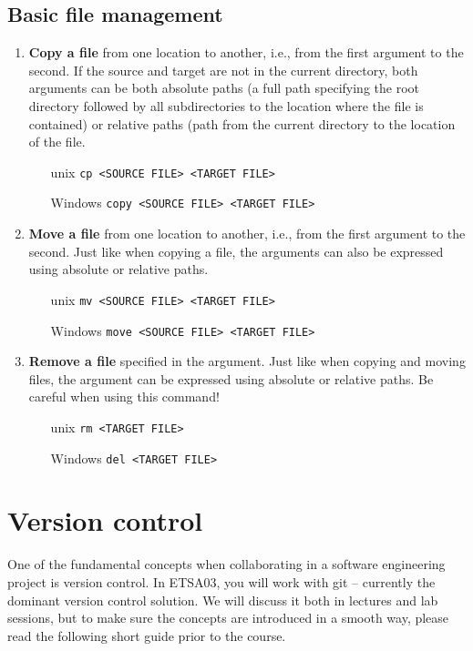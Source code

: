 \documentclass{scrreprt}
\begin{document}
\section{Basic file management}
\begin{enumerate}
\item \textbf{Copy a file} from one location to another, i.e., from the first argument to the second. If the source and target are not in the current directory, both arguments can be both absolute paths (a full path specifying  the root directory followed by all subdirectories to the location where the file is contained) or relative paths (path from the current directory to the location of the file.
\begin{itemize}
\item[unix] \texttt{cp <SOURCE FILE> <TARGET FILE>}
\item[Windows] \texttt{copy <SOURCE FILE> <TARGET FILE>}
\end{itemize}
\item \textbf{Move a file} from one location to another, i.e., from the first argument to the second. Just like when copying a file, the arguments can also be expressed using absolute or relative paths.
\begin{itemize}
\item[unix] \texttt{mv <SOURCE FILE> <TARGET FILE>}
\item[Windows] \texttt{move <SOURCE FILE> <TARGET FILE>}
\end{itemize}
\item \textbf{Remove a file} specified in the argument. Just like when copying and moving files, the argument can be expressed using absolute or relative paths. Be careful when using this command!
\begin{itemize}
\item[unix] \texttt{rm <TARGET FILE>}
\item[Windows] \texttt{del <TARGET FILE>}
\end{itemize}
\end{enumerate}

\chapter{Version control}
One of the fundamental concepts when collaborating in a software engineering project is version control. In ETSA03, you will work with git -- currently the dominant version control solution. We will discuss it both in lectures and lab sessions, but to make sure the concepts are introduced in a smooth way, please read the following short guide prior to the course.\\
\end{document}
